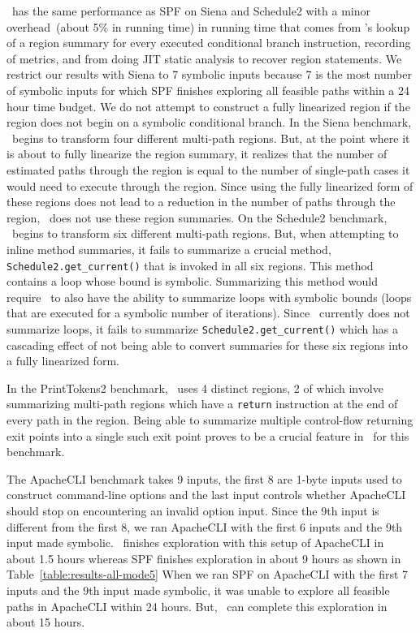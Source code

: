 \tool\ has the same performance as SPF on Siena and Schedule2 with a minor overhead~(about 5\% in running time) in
running time that comes from \tool\rq s lookup of a region summary for every executed conditional
branch instruction, recording of metrics, and from doing JIT static analysis to recover region statements.
%
We restrict our results with Siena to 7 symbolic inputs because 7 is the most number of symbolic inputs for which
SPF finishes exploring all feasible paths within a 24 hour time budget.
%
We do not attempt to construct a fully linearized region if the region does not begin on a symbolic conditional
branch.
%
In the Siena benchmark, \tool\ begins to transform four different multi-path regions.
%
But, at the point where it is about to fully linearize the region summary, it realizes that the number of estimated paths
through the region is equal to the number of single-path cases it would need to execute through the region.
%
Since using the fully linearized form of these regions does not lead to a reduction in the number of paths through the
region, \tool\ does not use these region summaries.
%
On the Schedule2 benchmark, \tool\ begins to transform six different multi-path regions.
%
But, when attempting to inline method summaries, it fails to summarize a crucial method, {\tt Schedule2.get\_current()}
that is invoked in all six regions.
%
This method contains a loop whose bound is symbolic.
%
Summarizing this method would require \tool\ to also have the ability to summarize loops with symbolic bounds (loops
that are executed for a symbolic number of iterations).
%
Since \tool\ currently does not summarize loops, it fails to summarize {\tt Schedule2.get\_current()} which has a
cascading effect of not being able to convert summaries for these six regions into a fully linearized form.

In the PrintTokens2 benchmark, \tool\ uses 4 distinct regions, 2 of which involve summarizing multi-path regions which
have a {\tt return} instruction at the end of every path in the region.
%
Being able to summarize multiple control-flow returning exit points into a single such exit point proves to be a crucial
feature in \tool\ for this benchmark.

The ApacheCLI benchmark takes 9 inputs, the first 8 are 1-byte inputs used to construct command-line options and
the last input controls whether ApacheCLI should stop on encountering an invalid option input.
%
Since the 9th input is different from the first 8, we ran ApacheCLI with the first 6 inputs and the 9th input
made symbolic.
%
\tool\ finishes exploration with this setup of ApacheCLI in about 1.5 hours whereas SPF finishes exploration in about 9
hours as shown in Table~\ref{table:results-all-mode5}
%
When we ran SPF on ApacheCLI with the first 7 inputs and the 9th input made symbolic, it was unable to explore all
feasible paths in ApacheCLI within 24 hours.
%
But, \tool\ can complete this exploration in about 15 hours.

